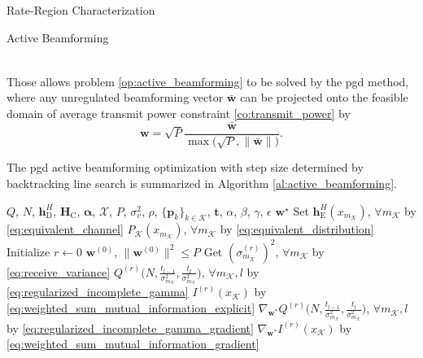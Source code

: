 \documentclass[journal]{IEEEtran}
\begin{document}
\begin{section}{Rate-Region Characterization}
\begin{subsection}{Active Beamforming}
\begin{figure*}[!b]
\begin{align}
				\label{eq:weighted_sum_mutual_information_gradient}
			\end{align}
		\end{figure*}
		Those allows problem \eqref{op:active_beamforming} to be solved by the \gls{pgd} method, where any unregulated beamforming vector $\bar{\boldsymbol{w}}$ can be projected onto the feasible domain of average transmit power constraint \eqref{co:transmit_power} by
		\begin{equation}
			\boldsymbol{w} = \sqrt{P} \frac{\bar{\boldsymbol{w}}}{\max\bigl(\sqrt{P},\lVert\bar{\boldsymbol{w}}\rVert\bigr)}.
			\label{eq:beamforming_projection}
		\end{equation}

		The \gls{pgd} active beamforming optimization with step size determined by backtracking line search is summarized in Algorithm \ref{al:active_beamforming}.
		\begin{algorithm}[!t]
			\caption{Iterative Active Beamforming Optimization by \gls{pgd} with Backtracking Line Search}
			\label{al:active_beamforming}
			\begin{algorithmic}[1]
				\Require $Q$, $N$, $\boldsymbol{h}_{\mathrm{D}}^H$, $\boldsymbol{H}_{\mathrm{C}}$, $\boldsymbol{\alpha}$, $\mathcal{X}$, $P$, $\sigma_v^2$, $\rho$, $\{\boldsymbol{p}_k\}_{k \in \mathcal{K}}$, $\boldsymbol{t}$, $\alpha$, $\beta$, $\gamma$, $\epsilon$
				\Ensure $\boldsymbol{w}^\star$
				\State Set $\boldsymbol{h}_{\mathrm{E}}^H(x_{m_{\mathcal{K}}})$, $\forall m_{\mathcal{K}}$ by \eqref{eq:equivalent_channel}
				\State \phantom{Set} $P_{\mathcal{K}}(x_{m_{\mathcal{K}}})$, $\forall m_{\mathcal{K}}$ by \eqref{eq:equivalent_distribution}
				\State Initialize $r \gets 0$
				\State \phantom{Initialize} $\boldsymbol{w}^{(0)}$, $\lVert\boldsymbol{w}^{(0)}\rVert^2 \le P$
				\State Get $(\sigma_{m_{\mathcal{K}}}^{(r)})^2$, $\forall m_{\mathcal{K}}$ by \eqref{eq:receive_variance} \label{st:gradient_descent_begin}
				\State \phantom{Get} $Q^{(r)}\bigl(N,\frac{t_{l-1}}{\sigma_{m_{\mathcal{K}}}^2},\frac{t_l}{\sigma_{m_{\mathcal{K}}}^2}\bigr)$, $\forall m_{\mathcal{K}},l$ by \eqref{eq:regularized_incomplete_gamma}
				\State \phantom{Get} $I^{(r)}(x_{\mathcal{K}})$ by \eqref{eq:weighted_sum_mutual_information_explicit} \label{st:gradient_descent_end}
				\State \phantom{Get} $\nabla_{\boldsymbol{w}^*} Q^{(r)}\bigl(N,\frac{t_{l-1}}{\sigma_{m_{\mathcal{K}}}^2},\frac{t_l}{\sigma_{m_{\mathcal{K}}}^2}\bigr)$, $\forall m_{\mathcal{K}},l$ by \eqref{eq:regularized_incomplete_gamma_gradient} \label{st:gradient_update_start}
				\State \phantom{Get} $\nabla_{\boldsymbol{w}^*} I^{(r)}(x_{\mathcal{K}})$ by \eqref{eq:weighted_sum_mutual_information_gradient} \label{st:gradient_update_end}

\end{algorithmic}
\end{algorithm}
\end{subsection}
\end{section}
\end{document}
